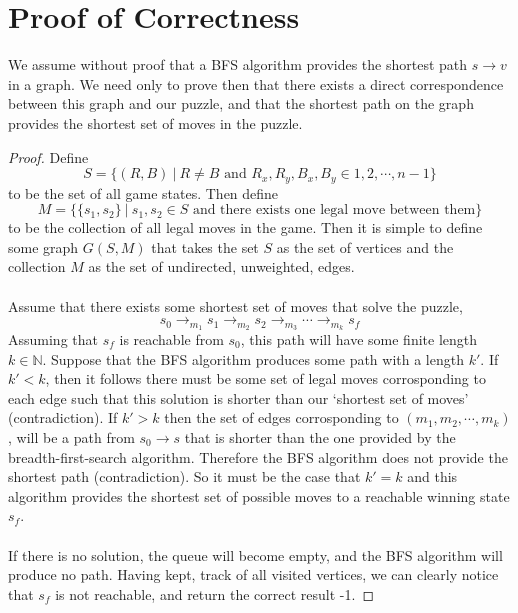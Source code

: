 \documentclass{article}
\theoremstyle{definition}
\begin{document}
\section{Proof of Correctness}
    We assume without proof that a BFS algorithm provides the shortest path $s \rightarrow v$ in a graph.
    We need only to prove then that there exists a direct correspondence between this graph and our puzzle, and that
    the shortest path on the graph provides the shortest set of moves in the puzzle.
    \begin{proof}
        Define $$S = \{(R,B) \ | \ R \neq B \text{ and } R_x,R_y,B_x,B_y \in 1,2,\cdots,n-1\}$$ to be the set of all game states. Then define 
        $$M = \{\{s_1,s_2\} \ | \ s_1,s_2 \in S \text { and there exists one legal move between them}\}$$ to be the collection of all legal moves in the game.
        Then it is simple to define some graph $G(S,M)$ that takes the set $S$ as the set of vertices and the collection $M$ as the set of undirected, unweighted, edges.
        \\\\
        Assume that there exists some shortest set of moves that solve the puzzle,
        $$ s_0 \rightarrow_{m_1} s_1 \rightarrow_{m_2} s_2 \rightarrow_{m_3} \cdots \rightarrow_{m_k} s_f$$
        Assuming that $s_f$ is reachable from $s_0$, this path will have some finite length $k \in \mathbb{N}$.
        Suppose that the BFS algorithm produces some path with a length $k'$. If $k' < k$, then it follows
        there must be some set of legal moves corrosponding to each edge such that this solution is shorter than our
        `shortest set of moves' (contradiction). If $k' > k$ then the set of edges corrosponding to $(m_1, m_2, \cdots , m_k)$,
        will be a path from $s_0 \rightarrow s$ that is shorter than the one provided by the breadth-first-search algorithm.
        Therefore the BFS algorithm does not provide the shortest path (contradiction). So it must be the case that $k' = k$ and
        this algorithm provides the shortest set of possible moves to a reachable winning state $s_f$.\\\\
        If there is no solution, the queue will become empty, and the BFS algorithm will produce no path. Having kept,
        track of all visited vertices, we can clearly notice that $s_f$ is not reachable, and return the correct result -1.
    \end{proof}
    
\end{document}

